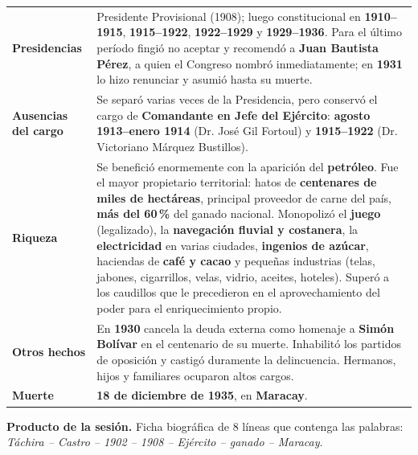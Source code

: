 \documentclass[12pt, letterpaper]{article}
\begin{document}
{\begin{longtable}{@{}>{\raggedright\arraybackslash}p{3.3cm} >{\raggedright\arraybackslash}p{12.3cm}@{}}
  \textbf{Presidencias} &
  Presidente Provisional (1908); luego constitucional en
  \textbf{1910--1915}, \textbf{1915--1922}, \textbf{1922--1929} y
  \textbf{1929--1936}. Para el último período fingió no aceptar y recomendó a
  \textbf{Juan Bautista Pérez}, a quien el Congreso nombró inmediatamente; en
  \textbf{1931} lo hizo renunciar y asumió hasta su muerte. \\

  \textbf{Ausencias del cargo} &
  Se separó varias veces de la Presidencia, pero conservó el cargo de
  \textbf{Comandante en Jefe del Ejército}: \textbf{agosto 1913--enero 1914}
  (Dr. José Gil Fortoul) y \textbf{1915--1922} (Dr. Victoriano Márquez
  Bustillos). \\

  \textbf{Riqueza} &
  Se benefició enormemente con la aparición del \textbf{petróleo}. Fue el mayor
  propietario territorial: hatos de \textbf{centenares de miles de
  hectáreas}, principal proveedor de carne del país, \textbf{más del 60\,\%} del
  ganado nacional. Monopolizó el \textbf{juego} (legalizado), la
  \textbf{navegación fluvial y costanera}, la \textbf{electricidad} en varias
  ciudades, \textbf{ingenios de azúcar}, haciendas de \textbf{café y cacao} y
  pequeñas industrias (telas, jabones, cigarrillos, velas, vidrio, aceites,
  hoteles). Superó a los caudillos que le precedieron en el aprovechamiento del
  poder para el enriquecimiento propio. \\

  \textbf{Otros hechos} &
  En \textbf{1930} cancela la deuda externa como homenaje a \textbf{Simón
  Bolívar} en el centenario de su muerte. Inhabilitó los partidos de oposición y castigó
  duramente la delincuencia. Hermanos, hijos y familiares ocuparon altos
  cargos. \\

  \textbf{Muerte} &
  \textbf{18 de diciembre de 1935}, en \textbf{Maracay}. \\
  \bottomrule
\end{longtable}
}

\begin{cuadropasos}
  \small
  \textbf{Producto de la sesión.} Ficha biográfica de 8 líneas que contenga las
  palabras: \textit{Táchira -- Castro -- 1902 -- 1908 -- Ejército -- ganado --
  Maracay}.
\end{cuadropasos}
\end{document}
